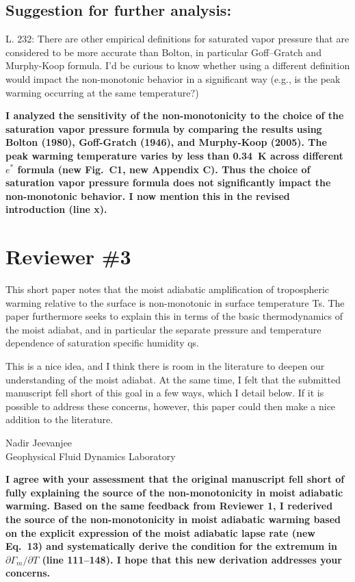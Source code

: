 \documentclass{article}
\begin{document}
\subsection{Suggestion for further analysis:}
\par
L. 232: There are other empirical definitions for saturated vapor pressure that are considered to be more accurate than Bolton, in particular Goff–Gratch and Murphy-Koop formula. I'd be curious to know whether using a different definition would impact the non-monotonic behavior in a significant way (e.g., is the peak warming occurring at the same temperature?)
\par
\textbf{I analyzed the sensitivity of the non-monotonicity to the choice of the saturation vapor pressure formula by comparing the results using Bolton (1980), Goff-Gratch (1946), and Murphy-Koop (2005). The peak warming temperature varies by less than 0.34~K across different $e^*$ formula (new Fig.~C1, new Appendix C). Thus the choice of saturation vapor pressure formula does not significantly impact the non-monotonic behavior. I now mention this in the revised introduction (line x).}
\par
\section{Reviewer \#3}

This short paper notes that the moist adiabatic amplification of tropospheric warming relative to the surface is non-monotonic in surface temperature Ts. The paper furthermore seeks to explain this in terms of the basic thermodynamics of the moist adiabat, and in particular the separate pressure and temperature dependence of saturation specific humidity qs.

This is a nice idea, and I think there is room in the literature to deepen our understanding of the moist adiabat. At the same time, I felt that the submitted manuscript fell short of this goal in a few ways, which I detail below. If it is possible to address these concerns, however, this paper could then make a nice addition to the literature.

Nadir Jeevanjee \\
Geophysical Fluid Dynamics Laboratory

\textbf{I agree with your assessment that the original manuscript fell short of fully explaining the source of the non-monotonicity in moist adiabatic warming. Based on the same feedback from Reviewer 1, I rederived the source of the non-monotonicity in moist adiabatic warming based on the explicit expression of the moist adiabatic lapse rate (new Eq.~13) and systematically derive the condition for the extremum in $\partial\Gamma_m/\partial T$ (line 111--148). I hope that this new derivation addresses your concerns.}
\end{document}
